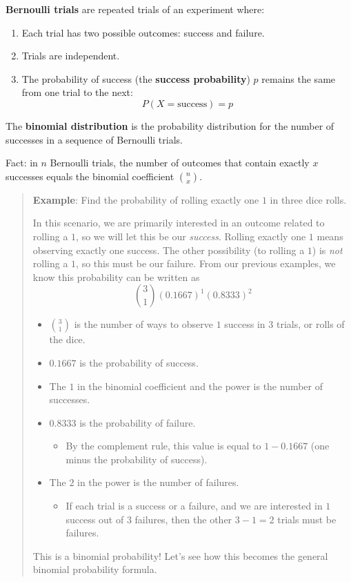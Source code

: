 \documentclass[
]{book}
\providecommand{\tightlist}{%
  \setlength{\itemsep}{0pt}\setlength{\parskip}{0pt}}
\begin{document}
\textbf{Bernoulli trials} are repeated trials of an experiment where:

\begin{enumerate}
\def\labelenumi{\arabic{enumi}.}
\tightlist
\item
  Each trial has two possible outcomes: success and failure.
\item
  Trials are independent.
\item
  The probability of success (the \textbf{success probability}) \(p\) remains the same from one trial to the next: \[P(X=\text{success})=p\]
\end{enumerate}

The \textbf{binomial distribution} is the probability distribution for the number of successes in a sequence of Bernoulli trials.

Fact: in \(n\) Bernoulli trials, the number of outcomes that contain exactly \(x\) successes equals the binomial coefficient \(\binom{n}{x}\).

\begin{quote}
\textbf{Example}: Find the probability of rolling exactly one \(1\) in three dice rolls.

In this scenario, we are primarily interested in an outcome related to rolling a \(1\), so we will let this be our \emph{success}. Rolling exactly one \(1\) means observing exactly one success. The other possibility (to rolling a \(1\)) is \emph{not} rolling a \(1\), so this must be our failure.
From our previous examples, we know this probability can be written as \[\binom{3}{1}(0.1667)^1(0.8333)^2\]

\begin{itemize}
\tightlist
\item
  \(\binom{3}{1}\) is the number of ways to observe \(1\) success in \(3\) trials, or rolls of the dice.
\item
  \(0.1667\) is the probability of success.
\item
  The \(1\) in the binomial coefficient and the power is the number of successes.
\item
  \(0.8333\) is the probability of failure.

  \begin{itemize}
  \tightlist
  \item
    By the complement rule, this value is equal to \(1-0.1667\) (one minus the probability of success).
  \end{itemize}
\item
  The \(2\) in the power is the number of failures.

  \begin{itemize}
  \tightlist
  \item
    If each trial is a success or a failure, and we are interested in \(1\) success out of \(3\) failures, then the other \(3-1=2\) trials must be failures.
  \end{itemize}
\end{itemize}

This is a binomial probability! Let's see how this becomes the general binomial probability formula.
\end{quote}
\end{document}
